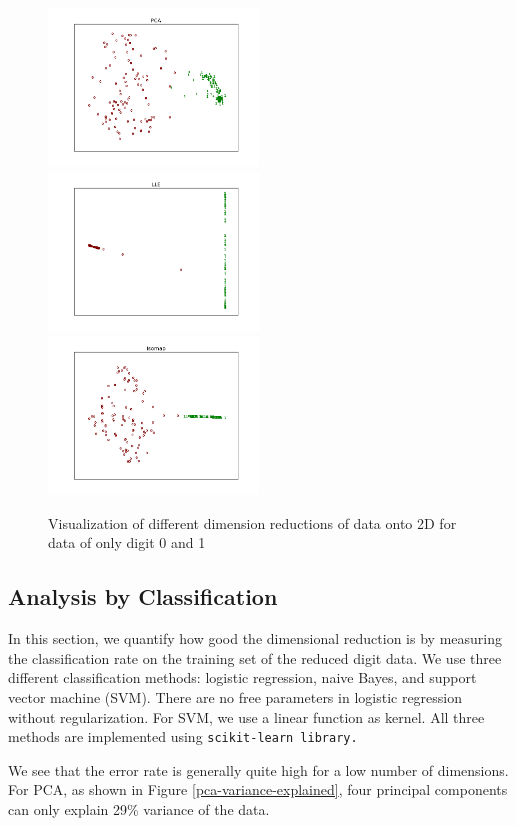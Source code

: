 \documentclass[11pt]{article}
\begin{document}
\begin{figure}[H]
\begin{center}
\includegraphics[width=2.2in]{pca2digit.png}
\includegraphics[width=2.2in]{lle2digit.png}
\includegraphics[width=2.2in]{isomap2digit.png}
\end{center}
\caption{Visualization of different dimension reductions of data onto 2D for data of only digit 0 and 1}
\label{reduce_2_digits}
\end{figure}

\subsection*{Analysis by Classification}
In this section, we quantify how good the dimensional reduction is by measuring the classification rate on the training set of the reduced digit data. We use three different classification methods: logistic regression, naive Bayes, and support vector machine (SVM). There are no free parameters in logistic regression without regularization. For SVM, we use a linear function as kernel. All three methods are implemented using \tt scikit-learn \rm library. 

We see that the error rate is generally quite high for a low number of dimensions. For PCA, as shown in Figure \ref{pca-variance-explained}, four principal components can only explain 29\% variance of the data.
\end{document}
